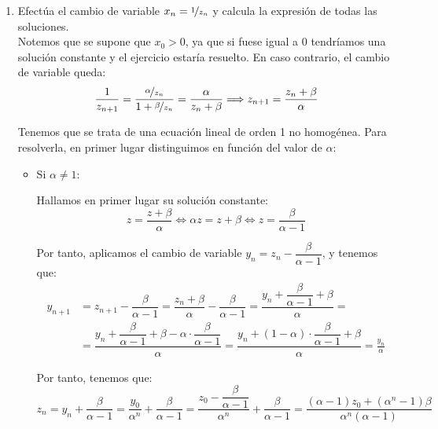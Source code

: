 \begin{ejercicio}
\begin{enumerate}
        \item Efectúa el cambio de variable $x_n=\nicefrac{1}{z_n}$ y calcula la expresión de todas las soluciones.\\

        Notemos que se supone que $x_0>0$, ya que si fuese igual a 0 tendríamos una solución constante y el ejercicio estaría resuelto. En caso contrario, el cambio de variable queda:
        \begin{equation*}
            \dfrac{1}{z_{n+1}} = \dfrac{\nicefrac{\alpha}{z_n}}{1+\nicefrac{\beta}{z_n}}
            = \dfrac{\alpha}{z_n+\beta}
            \Longrightarrow
            z_{n+1} = \dfrac{z_n+\beta}{\alpha}
        \end{equation*}

        Tenemos que se trata de una ecuación lineal de orden 1 no homogénea. Para resolverla, en primer lugar distinguimos en función del valor de $\alpha$:
        \begin{itemize}
            \item Si $\alpha\neq 1$:

            Hallamos en primer lugar su solución constante:
            \begin{equation*}
                z = \frac{z+\beta}{\alpha}
                \Longleftrightarrow
                \alpha z = z+\beta
                \Longleftrightarrow
                z = \frac{\beta}{\alpha-1}
            \end{equation*}
    
            Por tanto, aplicamos el cambio de variable $y_n = z_n - \dfrac{\beta}{\alpha-1}$, y tenemos que:
            \begin{align*}
                y_{n+1} &= z_{n+1} - \dfrac{\beta}{\alpha-1}
                = \dfrac{z_n+\beta}{\alpha} - \dfrac{\beta}{\alpha-1}
                = \dfrac{y_n + \dfrac{\beta}{\alpha-1}+\beta}{\alpha}
                =\\&= \dfrac{y_n + \dfrac{\beta}{\alpha-1}+\beta- \alpha\cdot \dfrac{\beta}{\alpha-1}}{\alpha}
                = \dfrac{y_n + (1-\alpha)\cdot \dfrac{\beta}{\alpha-1}+\beta}{\alpha}
                = \frac{y_n}{\alpha}
            \end{align*}
    
            Por tanto, tenemos que:
            \begin{equation*}
                z_{n} = y_n + \dfrac{\beta}{\alpha-1}
                = \frac{y_0}{\alpha^n}+ \dfrac{\beta}{\alpha-1}
                = \frac{z_0-\dfrac{\beta}{\alpha-1}}{\alpha^n}+ \dfrac{\beta}{\alpha-1}
                = \frac{(\alpha-1)z_0 + (\alpha^n-1)\beta}{\alpha^n(\alpha-1)}
            \end{equation*}
    

\end{itemize}
\end{enumerate}
\end{ejercicio}
